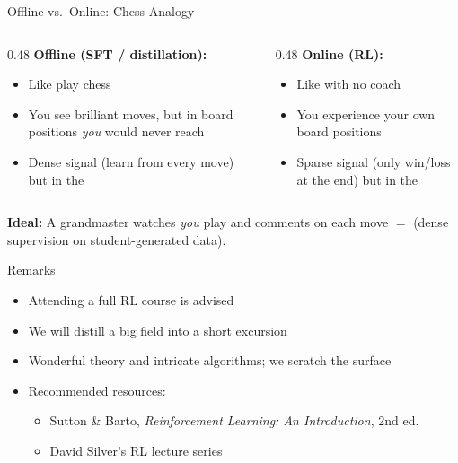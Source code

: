 \begin{frame}{Offline vs.\ Online: Chess Analogy}
  \begin{columns}[T]
    \begin{column}{0.48\textwidth}
      \textbf{Offline (SFT / distillation):}
      \begin{itemize}
        \item Like  play chess
        \item You see brilliant moves, but in board positions \emph{you} would never reach
        \item Dense signal (learn from every move) but in the 
      \end{itemize}
    \end{column}
    \begin{column}{0.48\textwidth}
      \textbf{Online (RL):}
      \begin{itemize}
        \item Like  with no coach
        \item You experience your own board positions
        \item Sparse signal (only win/loss at the end) but in the 
      \end{itemize}
    \end{column}
  \end{columns}

  \vspace{0.8em}
  \begin{tcolorbox}[colback=blue!5, colframe=blue!40, boxrule=0.5pt, arc=2pt, left=4pt, right=4pt, top=2pt, bottom=2pt]
    \textbf{Ideal:} A grandmaster watches \emph{you} play and comments on each move $=$  (dense supervision on student-generated data).
  \end{tcolorbox}
\end{frame}

\begin{frame}{Remarks}
  \begin{itemize}\largesep
    \item Attending a full RL course is advised
    \item We will distill a big field into a short excursion
    \item Wonderful theory and intricate algorithms; we scratch the surface
    \item Recommended resources:
      \begin{itemize}
        \item Sutton \& Barto, \emph{Reinforcement Learning: An Introduction}, 2nd ed.~\cite{sutton2018rl}
        \item David Silver's RL lecture series~\cite{silver2015rl}
      \end{itemize}
  \end{itemize}
\end{frame}

